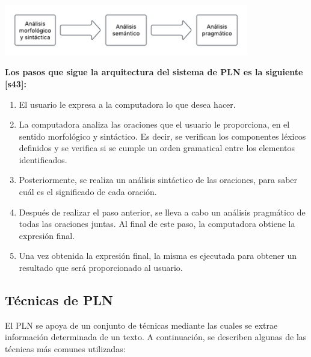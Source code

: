 \begin{center}
    \includegraphics[width=0.8\textwidth]{Images/diagraanali.png}
\end{center}

\textbf{Los pasos que sigue la arquitectura del sistema de PLN es la siguiente [s43]:}
\begin{enumerate}
    \item El usuario le expresa a la computadora lo que desea hacer.\\
    \item La computadora analiza las oraciones que el usuario le proporciona, en el sentido morfológico y sintáctico. Es decir, se verifican los componentes léxicos definidos y se verifica si se cumple un orden gramatical entre los elementos identificados.\\
    \item Posteriormente, se realiza un análisis sintáctico de las oraciones, para saber cuál es el significado de cada oración.\\
    \item Después de realizar el paso anterior, se lleva a cabo un análisis pragmático de todas las oraciones juntas. Al final de este paso, la computadora obtiene la expresión final.\\
    \item Una vez obtenida la expresión final, la misma es ejecutada para obtener un resultado que será proporcionado al usuario.
\end{enumerate}

\subsection{Técnicas de PLN}
El PLN se apoya de un conjunto de técnicas mediante las cuales se extrae información determinada de un texto. A continuación, se describen algunas de las técnicas más comunes utilizadas:


